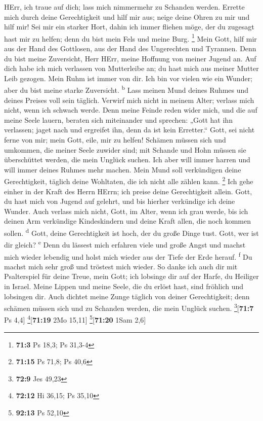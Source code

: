  HErr, ich traue auf dich; lass mich nimmermehr zu
Schanden werden.  Errette mich durch deine Gerechtigkeit
und hilf mir aus; neige deine Ohren zu mir und hilf mir! 
Sei mir ein starker Hort, dahin ich immer fliehen möge, der du zugesagt
hast mir zu helfen; denn du bist mein Fels und meine Burg. \footnote{\textbf{71:3}
  Ps 18,3; Ps 31,3-4}  Mein Gott, hilf mir aus der Hand
des Gottlosen, aus der Hand des Ungerechten und Tyrannen. 
Denn du bist meine Zuversicht, Herr HErr, meine Hoffnung von meiner
Jugend an.  Auf dich habe ich mich verlassen von
Mutterleibe an; du hast mich aus meiner Mutter Leib gezogen. Mein Ruhm
ist immer von dir.  Ich bin vor vielen wie ein Wunder;
aber du bist meine starke Zuversicht. \textsuperscript{b} 
Lass meinen Mund deines Ruhmes und deines Preises voll sein täglich.
 Verwirf mich nicht in meinem Alter; verlass mich nicht,
wenn ich schwach werde.  Denn meine Feinde reden wider
mich, und die auf meine Seele lauern, beraten sich miteinander
 und sprechen: „Gott hat ihn verlassen; jaget nach und
ergreifet ihn, denn da ist kein Erretter.``  Gott, sei
nicht ferne von mir; mein Gott, eile, mir zu helfen! 
Schämen müssen sich und umkommen, die meiner Seele zuwider sind; mit
Schande und Hohn müssen sie überschüttet werden, die mein Unglück
suchen.  Ich aber will immer harren und will immer deines
Ruhmes mehr machen.  Mein Mund soll verkündigen deine
Gerechtigkeit, täglich deine Wohltaten, die ich nicht alle zählen kann.
\footnote{\textbf{71:15} Ps 71,8; Ps 40,6}  Ich gehe
einher in der Kraft des Herrn HErrn; ich preise deine Gerechtigkeit
allein.  Gott, du hast mich von Jugend auf gelehrt, und
bis hierher verkündige ich deine Wunder.  Auch verlass
mich nicht, Gott, im Alter, wenn ich grau werde, bis ich deinen Arm
verkündige Kindeskindern und deine Kraft allen, die noch kommen sollen.
\textsuperscript{d}  Gott, deine Gerechtigkeit ist hoch,
der du große Dinge tust. Gott, wer ist dir gleich? \textsuperscript{e}
 Denn du lässest mich erfahren viele und große Angst und
machst mich wieder lebendig und holst mich wieder aus der Tiefe der Erde
herauf. \textsuperscript{f}  Du machst mich sehr groß und
tröstest mich wieder.  So danke ich auch dir mit
Psalterspiel für deine Treue, mein Gott; ich lobsinge dir auf der Harfe,
du Heiliger in Israel.  Meine Lippen und meine Seele, die
du erlöst hast, sind fröhlich und lobsingen dir.  Auch
dichtet meine Zunge täglich von deiner Gerechtigkeit; denn schämen
müssen sich und zu Schanden werden, die mein Unglück suchen.
\footnote{\textbf{72:9} Jes 49,23}{[}\textbf{71:7} Ps 4,4{]}
\footnote{\textbf{72:12} Hi 36,15; Ps 35,10}{[}\textbf{71:19} 2Mo
15,11{]} \footnote{\textbf{92:13} Ps 52,10}{[}\textbf{71:20} 1Sam 2,6{]}

